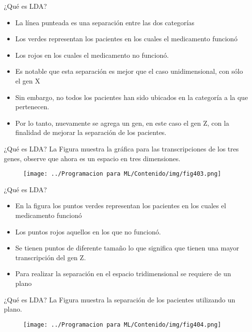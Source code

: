 \documentclass[11pt,aspectratio=169]{beamer}
\begin{document}
\begin{frame}{¿Qué es LDA?}
\begin{itemize}
	\item La línea punteada es una separación entre las dos categorías\pause
	\item Los verdes representan los pacientes en los cuales el medicamento funcionó\pause 
	\item Los rojos en los cuales el medicamento no funcionó.\pause
	\item Es notable que esta separación es mejor que el caso unidimensional, con sólo el gen X\pause
	\item Sin embargo, no todos los pacientes han sido ubicados en la categoría a la que pertenecen.\pause
	\item Por lo tanto, nuevamente se agrega un gen, en este caso el gen Z, con la finalidad de mejorar la separación de los pacientes.
\end{itemize}
\end{frame}

\begin{frame}{¿Qué es LDA?}
La Figura muestra la gráfica para las transcripciones de los tres genes, observe que ahora es un espacio en tres dimensiones. 
\begin{figure}[H]
	\centering
	\texttt{[image: ../Programacion para ML/Contenido/img/fig403.png]}
\end{figure}
\end{frame}

\begin{frame}{¿Qué es LDA?}
\begin{itemize}
	\item En la figura los puntos verdes representan los pacientes en los cuales el medicamento funcionó\pause
	\item Los puntos rojos aquellos en los que no funcionó. \pause
	\item Se tienen puntos de diferente tamaño lo que significa que tienen una mayor transcripción del gen Z. \pause
	\item Para realizar la separación en el espacio tridimensional se requiere de un plano
\end{itemize}
\end{frame}

\begin{frame}{¿Qué es LDA?}
La Figura muestra la separación de los pacientes utilizando un plano.
\begin{figure}[H]
	\centering
	\texttt{[image: ../Programacion para ML/Contenido/img/fig404.png]}
\end{figure}
\end{frame}
\end{document}
